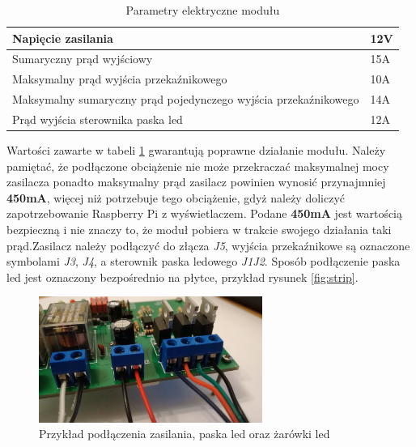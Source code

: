 \documentclass[12pt, eng, twoside, openany, final]{mgr}
\begin{document}
        \begin{table}[H]
        \centering
        \begin{tabular}{ | m{18em} | m{1cm}| } 
        \hline
        Napięcie zasilania & 12V \\ 
        \hline
        Sumaryczny prąd wyjściowy & 15A \\ 
        \hline
        Maksymalny prąd wyjścia przekaźnikowego &10A\\
        \hline
        Maksymalny sumaryczny prąd pojedynczego wyjścia przekaźnikowego &14A\\
        \hline
        Prąd wyjścia sterownika paska led &12A\\
        \hline
        \end{tabular}
        \caption{Parametry elektryczne modułu}
        \label{tab:param}
        \end{table}
    \noindent
    Wartości zawarte w tabeli \ref{tab:param} gwarantują poprawne działanie modułu. 
    Należy pamiętać, że podłączone obciążenie nie może przekraczać maksymalnej mocy zasilacza ponadto maksymalny prąd zasilacz powinien wynosić przynajmniej \textbf{450mA}, więcej niż potrzebuje tego obciążenie, gdyż należy doliczyć zapotrzebowanie Raspberry Pi z wyświetlaczem. Podane \textbf{450mA} jest wartością bezpieczną i nie znaczy to, że moduł pobiera w trakcie swojego działania taki prąd.\newpage \noindent Zasilacz należy podłączyć do złącza \emph{J5}, wyjścia przekaźnikowe są oznaczone symbolami \emph{J3}, \emph{J4}, a sterownik paska ledowego \emph{J1J2}. Sposób podłączenie paska led jest oznaczony bezpośrednio na płytce, przykład rysunek \ref{fig:strip}. 
        \begin{figure}[H]
        \begin{center}
            \includegraphics[width=0.65\textwidth]{podlaczone.jpg}
            \caption{Przykład podłączenia zasilania, paska led oraz żarówki led}
        \end{center}
        \end{figure}
\end{document}
